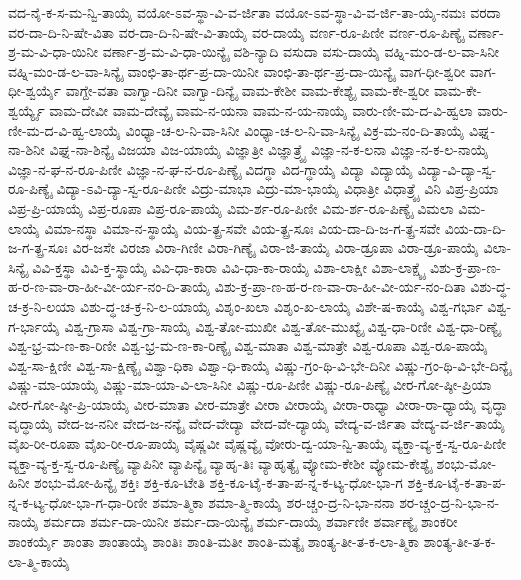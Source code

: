{ವದ-ನೈ-ಕ-ಸ-ಮ-ನ್ವಿ-ತಾಯೈ
ವಯೋ-ಽವ-ಸ್ಥಾ-ವಿ-ವ-ರ್ಜಿತಾ
ವಯೋ-ಽವ-ಸ್ಥಾ-ವಿ-ವ-ರ್ಜಿ-ತಾ-ಯೈ-ನಮಃ
ವರದಾ
ವರ-ದಾ-ದಿ-ನಿ-ಷೇ-ವಿತಾ
ವರ-ದಾ-ದಿ-ನಿ-ಷೇ-ವಿ-ತಾಯೈ
ವರ-ದಾಯೈ
ವರ್ಣ-ರೂ-ಪಿಣೀ
ವರ್ಣ-ರೂ-ಪಿಣ್ಯೈ
ವರ್ಣಾ-ಶ್ರ-ಮ-ವಿ-ಧಾ-ಯಿನೀ
ವರ್ಣಾ-ಶ್ರ-ಮ-ವಿ-ಧಾ-ಯಿನ್ಯೈ
ವಶಿ-ನ್ಯಾದಿ
ವಸುದಾ
ವಸು-ದಾಯೈ
ವಹ್ನಿ-ಮಂ-ಡ-ಲ-ವಾ-ಸಿನೀ
ವಹ್ನಿ-ಮಂ-ಡ-ಲ-ವಾ-ಸಿನ್ಯೈ
ವಾಂಛಿ-ತಾ-ರ್ಥ-ಪ್ರ-ದಾ-ಯಿನೀ
ವಾಂಛಿ-ತಾ-ರ್ಥ-ಪ್ರ-ದಾ-ಯಿನ್ಯೈ
ವಾಗ-ಧೀ-ಶ್ವರೀ
ವಾಗ-ಧೀ-ಶ್ವರ್ಯೈ
ವಾಗ್ದೇ-ವತಾ
ವಾಗ್ವಾ-ದಿನೀ
ವಾಗ್ವಾ-ದಿನ್ಯೈ
ವಾಮ-ಕೇಶೀ
ವಾಮ-ಕೇಶ್ಯೈ
ವಾಮ-ಕೇ-ಶ್ವರೀ
ವಾಮ-ಕೇ-ಶ್ವರ್ಯ್ಯೈ
ವಾಮ-ದೇವೀ
ವಾಮ-ದೇವ್ಯೈ
ವಾಮ-ನ-ಯನಾ
ವಾಮ-ನ-ಯ-ನಾಯೈ
ವಾರು-ಣೀ-ಮ-ದ-ವಿ-ಹ್ವಲಾ
ವಾರು-ಣೀ-ಮ-ದ-ವಿ-ಹ್ವ-ಲಾಯೈ
ವಿಂಧ್ಯಾ-ಚ-ಲ-ನಿ-ವಾ-ಸಿನೀ
ವಿಂಧ್ಯಾ-ಚ-ಲ-ನಿ-ವಾ-ಸಿನ್ಯೈ
ವಿಕ್ರ-ಮ-ನಂ-ದಿ-ತಾಯೈ
ವಿಘ್ನ-ನಾ-ಶಿನೀ
ವಿಘ್ನ-ನಾ-ಶಿನ್ಯೈ
ವಿಜಯಾ
ವಿಜ-ಯಾಯೈ
ವಿಜ್ಞಾತ್ರೀ
ವಿಜ್ಞಾತ್ರ್ಯೈ
ವಿಜ್ಞಾ-ನ-ಕ-ಲನಾ
ವಿಜ್ಞಾ-ನ-ಕ-ಲ-ನಾಯೈ
ವಿಜ್ಞಾ-ನ-ಘ-ನ-ರೂ-ಪಿಣೀ
ವಿಜ್ಞಾ-ನ-ಘ-ನ-ರೂ-ಪಿಣ್ಯೈ
ವಿದಗ್ಧಾ
ವಿದ-ಗ್ಧಾಯೈ
ವಿದ್ಯಾ
ವಿದ್ಯಾಯೈ
ವಿದ್ಯಾ-ವಿ-ದ್ಯಾ-ಸ್ವ-ರೂ-ಪಿಣ್ಯೈ
ವಿದ್ಯಾ-ಽವಿ-ದ್ಯಾ-ಸ್ವ-ರೂ-ಪಿಣೀ
ವಿದ್ರು-ಮಾಭಾ
ವಿದ್ರು-ಮಾ-ಭಾಯೈ
ವಿಧಾತ್ರೀ
ವಿಧಾತ್ರ್ಯೈ
ವಿನಿ
ವಿಪ್ರ-ಪ್ರಿಯಾ
ವಿಪ್ರ-ಪ್ರಿ-ಯಾಯೈ
ವಿಪ್ರ-ರೂಪಾ
ವಿಪ್ರ-ರೂ-ಪಾಯೈ
ವಿಮ-ರ್ಶ-ರೂ-ಪಿಣೀ
ವಿಮ-ರ್ಶ-ರೂ-ಪಿಣ್ಯೈ
ವಿಮಲಾ
ವಿಮ-ಲಾಯೈ
ವಿಮಾ-ನಸ್ಥಾ
ವಿಮಾ-ನ-ಸ್ಥಾಯೈ
ವಿಯ-ತ್ಪ್ರ-ಸವೇ
ವಿಯ-ತ್ಪ್ರ-ಸೂಃ
ವಿಯ-ದಾ-ದಿ-ಜ-ಗ-ತ್ಪ್ರ-ಸವೇ
ವಿಯ-ದಾ-ದಿ-ಜ-ಗ-ತ್ಪ್ರ-ಸೂಃ
ವಿರ-ಜಸೇ
ವಿರಜಾ
ವಿರಾ-ಗಿಣೀ
ವಿರಾ-ಗಿಣ್ಯೈ
ವಿರಾ-ಜಿ-ತಾಯೈ
ವಿರಾ-ಡ್ರೂಪಾ
ವಿರಾ-ಡ್ರೂ-ಪಾಯೈ
ವಿಲಾ-ಸಿನ್ಯೈ
ವಿವಿ-ಕ್ತಸ್ಥಾ
ವಿವಿ-ಕ್ತ-ಸ್ಥಾಯೈ
ವಿವಿ-ಧಾ-ಕಾರಾ
ವಿವಿ-ಧಾ-ಕಾ-ರಾಯೈ
ವಿಶಾ-ಲಾಕ್ಷೀ
ವಿಶಾ-ಲಾಕ್ಷ್ಯೈ
ವಿಶು-ಕ್ರ-ಪ್ರಾ-ಣ-ಹ-ರ-ಣ-ವಾ-ರಾ-ಹೀ-ವೀ-ರ್ಯ-ನಂ-ದಿ-ತಾಯೈ
ವಿಶು-ಕ್ರ-ಪ್ರಾ-ಣ-ಹ-ರ-ಣ-ವಾ-ರಾ-ಹೀ-ವೀ-ರ್ಯ-ನಂ-ದಿತಾ
ವಿಶು-ದ್ಧ-ಚ-ಕ್ರ-ನಿ-ಲಯಾ
ವಿಶು-ದ್ಧ-ಚ-ಕ್ರ-ನಿ-ಲ-ಯಾಯೈ
ವಿಶೃಂ-ಖಲಾ
ವಿಶೃಂ-ಖ-ಲಾಯೈ
ವಿಶೇ-ಷ-ಕಾಯೈ
ವಿಶ್ವ-ಗರ್ಭಾ
ವಿಶ್ವ-ಗ-ರ್ಭಾಯೈ
ವಿಶ್ವ-ಗ್ರಾಸಾ
ವಿಶ್ವ-ಗ್ರಾ-ಸಾಯೈ
ವಿಶ್ವ-ತೋ-ಮುಖೀ
ವಿಶ್ವ-ತೋ-ಮುಖ್ಯೈ
ವಿಶ್ವ-ಧಾ-ರಿಣೀ
ವಿಶ್ವ-ಧಾ-ರಿಣ್ಯೈ
ವಿಶ್ವ-ಭ್ರ-ಮ-ಣ-ಕಾ-ರಿಣೀ
ವಿಶ್ವ-ಭ್ರ-ಮ-ಣ-ಕಾ-ರಿಣ್ಯೈ
ವಿಶ್ವ-ಮಾತಾ
ವಿಶ್ವ-ಮಾತ್ರೇ
ವಿಶ್ವ-ರೂಪಾ
ವಿಶ್ವ-ರೂ-ಪಾಯೈ
ವಿಶ್ವ-ಸಾ-ಕ್ಷಿಣೀ
ವಿಶ್ವ-ಸಾ-ಕ್ಷಿಣ್ಯೈ
ವಿಶ್ವಾ-ಧಿಕಾ
ವಿಶ್ವಾ-ಧಿ-ಕಾಯೈ
ವಿಷ್ಣು-ಗ್ರಂ-ಥಿ-ವಿ-ಭೇ-ದಿನೀ
ವಿಷ್ಣು-ಗ್ರಂ-ಥಿ-ವಿ-ಭೇ-ದಿನ್ಯೈ
ವಿಷ್ಣು-ಮಾ-ಯಾಯೈ
ವಿಷ್ಣು-ಮಾ-ಯಾ-ವಿ-ಲಾ-ಸಿನೀ
ವಿಷ್ಣು-ರೂ-ಪಿಣೀ
ವಿಷ್ಣು-ರೂ-ಪಿಣ್ಯೈ
ವೀರ-ಗೋ-ಷ್ಠೀ-ಪ್ರಿಯಾ
ವೀರ-ಗೋ-ಷ್ಠೀ-ಪ್ರಿ-ಯಾಯೈ
ವೀರ-ಮಾತಾ
ವೀರ-ಮಾತ್ರೇ
ವೀರಾ
ವೀರಾಯೈ
ವೀರಾ-ರಾಧ್ಯಾ
ವೀರಾ-ರಾ-ಧ್ಯಾಯೈ
ವೃದ್ಧಾ
ವೃದ್ಧಾಯೈ
ವೇದ-ಜ-ನನೀ
ವೇದ-ಜ-ನನ್ಯೈ
ವೇದ-ವೇದ್ಯಾ
ವೇದ-ವೇ-ದ್ಯಾಯೈ
ವೇದ್ಯ-ವ-ರ್ಜಿತಾ
ವೇದ್ಯ-ವ-ರ್ಜಿ-ತಾಯೈ
ವೈಖ-ರೀ-ರೂಪಾ
ವೈಖ-ರೀ-ರೂ-ಪಾಯೈ
ವೈಷ್ಣವೀ
ವೈಷ್ಣವ್ಯೈ
ವೋರು-ದ್ವ-ಯಾ-ನ್ವಿ-ತಾಯೈ
ವ್ಯಕ್ತಾ-ವ್ಯ-ಕ್ತ-ಸ್ವ-ರೂ-ಪಿಣೀ
ವ್ಯಕ್ತಾ-ವ್ಯ-ಕ್ತ-ಸ್ವ-ರೂ-ಪಿಣ್ಯೈ
ವ್ಯಾಪಿನೀ
ವ್ಯಾಪಿನ್ಯೈ
ವ್ಯಾಹೃ-ತಿಃ
ವ್ಯಾಹೃತ್ಯೈ
ವ್ಯೋಮ-ಕೇಶೀ
ವ್ಯೋಮ-ಕೇಶ್ಯೈ
ಶಂಭು-ಮೋ-ಹಿನೀ
ಶಂಭು-ಮೋ-ಹಿನ್ಯೈ
ಶಕ್ತಿಃ
ಶಕ್ತಿ-ಕೂ-ಟೇತಿ
ಶಕ್ತಿ-ಕೂ-ಟೈ-ಕ-ತಾ-ಪ-ನ್ನ-ಕ-ಟ್ಯ-ಧೋ-ಭಾ-ಗ
ಶಕ್ತಿ-ಕೂ-ಟೈ-ಕ-ತಾ-ಪ-ನ್ನ-ಕ-ಟ್ಯ-ಧೋ-ಭಾ-ಗ-ಧಾ-ರಿಣೀ
ಶಮಾ-ತ್ಮಿಕಾ
ಶಮಾ-ತ್ಮಿ-ಕಾಯೈ
ಶರ-ಚ್ಚಂ-ದ್ರ-ನಿ-ಭಾ-ನನಾ
ಶರ-ಚ್ಚಂ-ದ್ರ-ನಿ-ಭಾ-ನ-ನಾಯೈ
ಶರ್ಮದಾ
ಶರ್ಮ-ದಾ-ಯಿನೀ
ಶರ್ಮ-ದಾ-ಯಿನ್ಯೈ
ಶರ್ಮ-ದಾಯೈ
ಶರ್ವಾಣೀ
ಶರ್ವಾಣ್ಯೈ
ಶಾಂಕರೀ
ಶಾಂಕರ್ಯೈ
ಶಾಂತಾ
ಶಾಂತಾಯೈ
ಶಾಂತಿಃ
ಶಾಂತಿ-ಮತೀ
ಶಾಂತಿ-ಮತ್ಯೈ
ಶಾಂತ್ಯ-ತೀ-ತ-ಕ-ಲಾ-ತ್ಮಿಕಾ
ಶಾಂತ್ಯ-ತೀ-ತ-ಕ-ಲಾ-ತ್ಮಿ-ಕಾಯೈ
}
